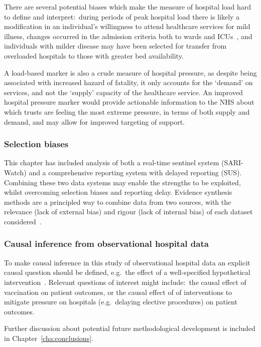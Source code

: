 There are several potential biases which make the measure of hospital load hard to define and interpret:\ during periods of peak hospital load there is likely a modification in an individual’s willingness to attend healthcare services for mild illness, changes occurred in the admission criteria both to wards and ICUs~\parencite{NHS_England2020-al}, and individuals with milder disease may have been selected for transfer from overloaded hospitals to those with greater bed availability.

A load-based marker is also a crude measure of hospital pressure, as despite being associated with increased hazard of fatality, it only accounts for the `demand' on services, and not the `supply' capacity of the healthcare service. An improved hospital pressure marker would provide actionable information to the NHS about which trusts are feeling the most extreme pressure, in terms of both supply and demand, and may allow for improved targeting of support.

\subsubsection{Selection biases}

This chapter has included analysis of both a real-time sentinel system (SARI-Watch) and a comprehensive reporting system with delayed reporting (SUS). Combining these two data systems may enable the strengths to be exploited, whilst overcoming selection biases and reporting delay. Evidence synthesis methods are a principled way to combine data from two sources, with the relevance (lack of external bias) and rigour (lack of internal bias) of each dataset considered~\parencite{Welton2005-zf, Turner2009-bf}.

\subsubsection{Causal inference from observational hospital data}

To make causal inference in this study of observational hospital data an explicit causal question should be defined, e.g.\ the effect of a well-specified hypothetical intervention~\parencite{Hernan2023-de}. Relevant questions of interest might include:\ the causal effect of vaccination on patient outcomes, or the causal effect of of interventions to mitigate pressure on hospitals (e.g.\ delaying elective procedures) on patient outcomes.

Further discussion about potential future methodological development is included in Chapter~\ref{cha:conclusions}.

